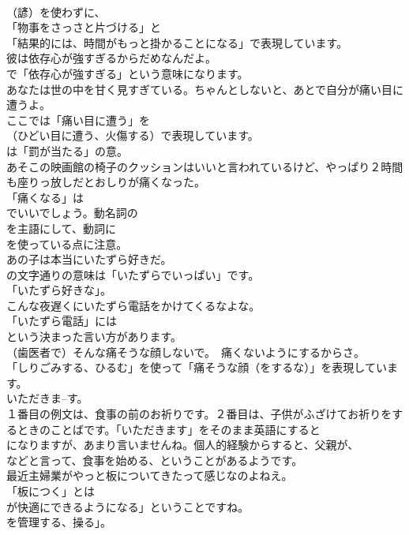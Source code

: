 \documentclass[8pt]{extreport}
\begin{document}
\begin{CJK}{UTF8}{min}
\\	（諺）を使わずに、
\\	「物事をさっさと片づける」と
\\	「結果的には、時間がもっと掛かることになる」で表現しています。	
\\	彼は依存心が強すぎるからだめなんだよ。 
\\	で「依存心が強すぎる」という意味になります。	
\\	あなたは世の中を甘く見すぎている。ちゃんとしないと、あとで自分が痛い目に遭うよ。 
\\	ここでは「痛い目に遭う」を 
\\	（ひどい目に遭う、火傷する）で表現しています。
\\	は「罰が当たる」の意。	
\\	あそこの映画館の椅子のクッションはいいと言われているけど、やっぱり２時間も座りっ放しだとおしりが痛くなった。 
\\	「痛くなる」は 
\\	でいいでしょう。動名詞の 
\\	を主語にして、動詞に 
\\	を使っている点に注意。	
\\	あの子は本当にいたずら好きだ。 
\\	の文字通りの意味は「いたずらでいっぱい」です。
\\	「いたずら好きな」。	
\\	こんな夜遅くにいたずら電話をかけてくるなよな。 
\\	「いたずら電話」には
\\	という決まった言い方があります。	
\\	（歯医者で）そんな痛そうな顔しないで。　痛くないようにするからさ。 
\\	「しりごみする、ひるむ」を使って「痛そうな顔（をするな）」を表現しています。	
\\	いただきま--す。 
\\	１番目の例文は、食事の前のお祈りです。２番目は、子供がふざけてお祈りをするときのことばです。「いただきます」をそのまま英語にすると
\\	になりますが、あまり言いませんね。個人的経験からすると、父親が、
\\	などと言って、食事を始める、ということがあるようです。	
\\	最近主婦業がやっと板についてきたって感じなのよねえ。 
\\	「板につく」とは
\\	が快適にできるようになる」ということですね。
\\	を管理する、操る」。	

\end{CJK}
\end{document}
